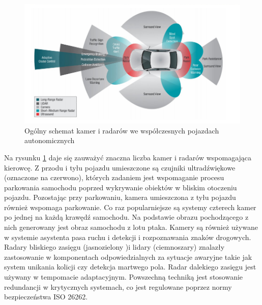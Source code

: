 \begin{figure}
  \centering
  \includegraphics[width=13cm]{img/systemy_autonomiczne_ogolnie.png}
  \caption{Ogólny schemat kamer i radarów we współczesnych pojazdach autonomicznych\cite{S1}}
  \label{fig:kamery_i_radary}
\end{figure}

Na rysunku \ref{fig:kamery_i_radary} daje się zauważyć znaczna liczba kamer i radarów wspomagająca kierowcę. Z przodu i tyłu pojazdu umieszczone są czujniki ultradźwiękowe (oznaczone na czerwono), których zadaniem jest wspomaganie procesu parkowania samochodu poprzed wykrywanie obiektów w bliskim otoczeniu pojazdu.
Pozostając przy parkowaniu, kamera umieszczona z tyłu pojazdu również wspomaga parkowanie. Co raz popularniejsze są systemy czterech kamer po jednej na każdą krawędź samochodu. Na podstawie obrazu pochodzącego z nich generowany jest obraz samochodu z lotu ptaka.
Kamery są również używane w systemie asystenta pasa ruchu i detekcji i rozpoznawania znaków drogowych.
Radary bliskiego zasięgu (jasnozielony )i lidary (ciemnoszary) znalazły zastosowanie w komponentach odpowiedzialnych za sytuacje awaryjne takie jak system unikania kolicji czy detekcja martwego pola.
Radar dalekiego zasięgu jest używany w tempomacie adaptacyjnym.
Powszechną techniką jest stosowanie redundancji w krytycznych systemach, co jest regulowane poprzez normy bezpieczeństwa ISO 26262.


